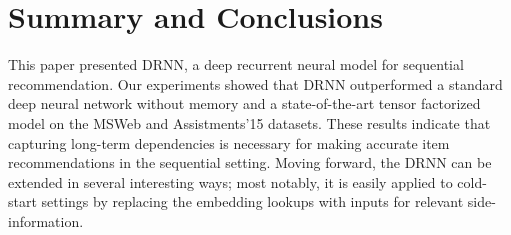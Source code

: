 \documentclass{sig-alternate-05-2015}
\begin{document}
%


\section{Summary and Conclusions}
This paper presented DRNN, a deep recurrent neural model for sequential recommendation. Our experiments showed that DRNN outperformed a standard deep neural network without memory and a state-of-the-art tensor factorized model on the MSWeb and Assistments'15 datasets. These results indicate that capturing long-term dependencies is necessary for making accurate item recommendations in the sequential setting. Moving forward, the DRNN can be extended in several interesting ways; most notably, it is easily applied to cold-start settings by replacing the embedding lookups with inputs for relevant side-information. 
\end{document}
